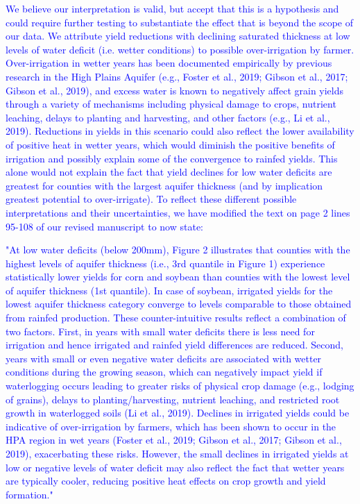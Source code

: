 \documentclass[
]{article}
\begin{document}
\textcolor{blue}{We believe our interpretation is valid, but accept that this is a hypothesis and could require further testing to substantiate the effect that is beyond the scope of our data. We attribute yield reductions with declining saturated thickness at low levels of water deficit (i.e. wetter conditions) to possible over-irrigation by farmer. Over-irrigation in wetter years has been documented empirically by previous research in the High Plains Aquifer (e.g., Foster et al., 2019; Gibson et al., 2017; Gibson et al., 2019), and excess water is known to negatively affect grain yields through a variety of mechanisms including physical damage to crops, nutrient leaching, delays to planting and harvesting, and other factors (e.g., Li et al., 2019). Reductions in yields in this scenario could also reflect the lower availability of positive heat in wetter years, which would diminish the positive benefits of irrigation and possibly explain some of the convergence to rainfed yields. This alone would not explain the fact that yield declines for low water deficits are greatest for counties with the largest aquifer thickness (and by implication greatest potential to over-irrigate). To reflect these different possible interpretations and their uncertainties, we have modified the text on page 2 lines 95-108 of our revised manuscript to now state:}

\textcolor{blue}{"At low water deficits (below 200mm), Figure 2 illustrates that counties with the highest levels of aquifer thickness (i.e., 3rd quantile in Figure 1) experience statistically lower yields for corn and soybean than counties with the lowest level of aquifer thickness (1st quantile). In case of soybean, irrigated yields for the lowest aquifer thickness category converge to levels comparable to those obtained from rainfed production. These counter-intuitive results reflect a combination of two factors. First, in years with small water deficits there is less need for irrigation and hence irrigated and rainfed yield differences are reduced. Second, years with small or even negative water deficits are associated with wetter conditions during the growing season, which can negatively impact yield if waterlogging occurs leading to greater risks of physical crop damage (e.g., lodging of grains), delays to planting/harvesting, nutrient leaching, and restricted root growth in waterlogged soils (Li et al., 2019). Declines in irrigated yields could be indicative of over-irrigation by farmers, which has been shown to occur in the HPA region in wet years (Foster et al., 2019; Gibson et al., 2017; Gibson et al., 2019), exacerbating these risks. However, the small declines in irrigated yields at low or negative levels of water deficit may also reflect the fact that wetter years are typically cooler, reducing positive heat effects on crop growth and yield formation."}
\end{document}
